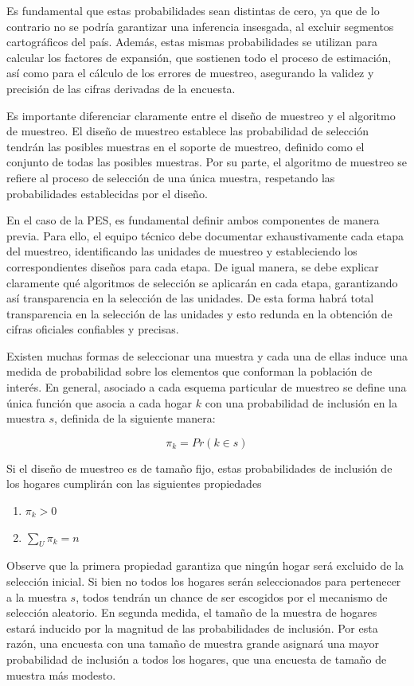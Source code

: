 \documentclass[
  12pt,
]{book}
\providecommand{\tightlist}{%
  \setlength{\itemsep}{0pt}\setlength{\parskip}{0pt}}
\begin{document}
Es fundamental que estas probabilidades sean distintas de cero, ya que de lo contrario no se podría garantizar una inferencia insesgada, al excluir segmentos cartográficos del país. Además, estas mismas probabilidades se utilizan para calcular los factores de expansión, que sostienen todo el proceso de estimación, así como para el cálculo de los errores de muestreo, asegurando la validez y precisión de las cifras derivadas de la encuesta.

Es importante diferenciar claramente entre el diseño de muestreo y el algoritmo de muestreo. El diseño de muestreo establece las probabilidad de selección tendrán las posibles muestras en el soporte de muestreo, definido como el conjunto de todas las posibles muestras. Por su parte, el algoritmo de muestreo se refiere al proceso de selección de una única muestra, respetando las probabilidades establecidas por el diseño.

En el caso de la PES, es fundamental definir ambos componentes de manera previa. Para ello, el equipo técnico debe documentar exhaustivamente cada etapa del muestreo, identificando las unidades de muestreo y estableciendo los correspondientes diseños para cada etapa. De igual manera, se debe explicar claramente qué algoritmos de selección se aplicarán en cada etapa, garantizando así transparencia en la selección de las unidades. De esta forma habrá total transparencia en la selección de las unidades y esto redunda en la obtención de cifras oficiales confiables y precisas.

Existen muchas formas de seleccionar una muestra y cada una de ellas induce una medida de probabilidad sobre los elementos que conforman la población de interés. En general, asociado a cada esquema particular de muestreo se define una única función que asocia a cada hogar \(k\) con una probabilidad de inclusión en la muestra \(s\), definida de la siguiente manera:

\[\pi_k = Pr (k \in s)\]

Si el diseño de muestreo es de tamaño fijo, estas probabilidades de inclusión de los hogares cumplirán con las siguientes propiedades

\begin{enumerate}
\def\labelenumi{\arabic{enumi}.}
\tightlist
\item
  \(\pi_k > 0\)
\item
  \(\sum_U \pi_k = n\)
\end{enumerate}

Observe que la primera propiedad garantiza que ningún hogar será excluido de la selección inicial. Si bien no todos los hogares serán seleccionados para pertenecer a la muestra \(s\), todos tendrán un chance de ser escogidos por el mecanismo de selección aleatorio. En segunda medida, el tamaño de la muestra de hogares estará inducido por la magnitud de las probabilidades de inclusión. Por esta razón, una encuesta con una tamaño de muestra grande asignará una mayor probabilidad de inclusión a todos los hogares, que una encuesta de tamaño de muestra más modesto.
\end{document}
